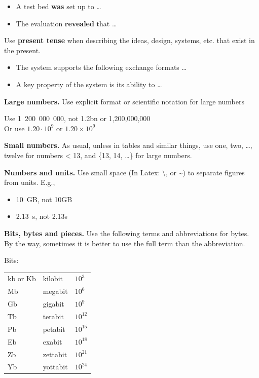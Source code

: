\documentclass{newseye_del}
\begin{document}
\begin{itemize}
    \item A test bed \textbf{was} set up to \dots
    \item The evaluation \textbf{revealed} that \dots
\end{itemize}

Use \textbf{present tense} when describing the ideas, design, systems, etc. that
exist in the present.

\begin{itemize}
    \item The system supports the following exchange formats \dots
    \item A key property of the system is its ability to \dots
\end{itemize}


\textbf{Large numbers.} Use explicit format or scientific notation for large
numbers

Use 1~200~000~000, not 1.2bn or 1,200,000,000\\
Or use $1.20\cdot10^9$ or  $1.20\times10^9$

\textbf{Small numbers.} As usual, unless in tables and similar things, use {one,
two, \dots, twelve} for numbers < 13, and \{13, 14, \dots\} for large numbers.

\textbf{Numbers and units.} Use small space (In Latex: \textbackslash, or
\textasciitilde) to separate figures from units. E.g.,

\begin{itemize}
    \item 10~GB, not 10GB
    \item 2.13~s, not 2.13s
\end{itemize}

\textbf{Bits, bytes and pieces.} Use the following terms and abbreviations for
bytes. By the way, sometimes it is better to use the full term than the
abbreviation.

Bits:\\
\begin{tabular}{lll}
    kb or Kb & kilobit & $10^3$ \\
    Mb & megabit & $10^6$ \\
    Gb & gigabit & $10^9$ \\
    Tb & terabit & $10^{12}$ \\
    Pb & petabit & $10^{15}$ \\
    Eb & exabit & $10^{18}$ \\
    Zb & zettabit & $10^{21}$ \\
    Yb & yottabit & $10^{24}$ \\
\end{tabular}
\end{document}
